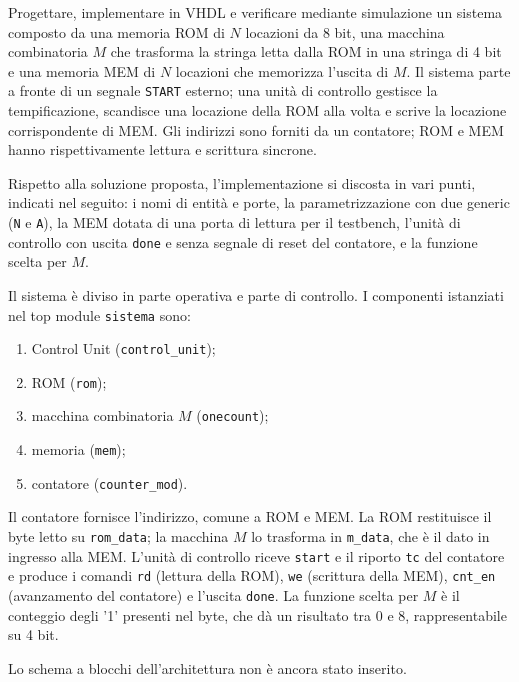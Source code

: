 \label{sec:esercizio6-1}

\begin{traccia}
Progettare, implementare in VHDL e verificare mediante simulazione un sistema composto da una memoria ROM di $N$ locazioni da 8 bit, una macchina combinatoria $M$ che trasforma la stringa letta dalla ROM in una stringa di 4 bit e una memoria MEM di $N$ locazioni che memorizza l'uscita di $M$. Il sistema parte a fronte di un segnale \texttt{START} esterno; una unità di controllo gestisce la tempificazione, scandisce una locazione della ROM alla volta e scrive la locazione corrispondente di MEM. Gli indirizzi sono forniti da un contatore; ROM e MEM hanno rispettivamente lettura e scrittura sincrone.
\end{traccia}

Rispetto alla soluzione proposta, l'implementazione si discosta in vari punti, indicati nel seguito: i nomi di entità e porte, la parametrizzazione con due generic (\texttt{N} e \texttt{A}), la MEM dotata di una porta di lettura per il testbench, l'unità di controllo con uscita \texttt{done} e senza segnale di reset del contatore, e la funzione scelta per $M$.

\progetto

Il sistema è diviso in parte operativa e parte di controllo. I componenti istanziati nel top module \texttt{sistema} sono:
\begin{enumerate}
  \item Control Unit (\texttt{control\_unit});
  \item ROM (\texttt{rom});
  \item macchina combinatoria $M$ (\texttt{onecount});
  \item memoria (\texttt{mem});
  \item contatore (\texttt{counter\_mod}).
\end{enumerate}

Il contatore fornisce l'indirizzo, comune a ROM e MEM. La ROM restituisce il byte letto su \texttt{rom\_data}; la macchina $M$ lo trasforma in \texttt{m\_data}, che è il dato in ingresso alla MEM. L'unità di controllo riceve \texttt{start} e il riporto \texttt{tc} del contatore e produce i comandi \texttt{rd} (lettura della ROM), \texttt{we} (scrittura della MEM), \texttt{cnt\_en} (avanzamento del contatore) e l'uscita \texttt{done}. La funzione scelta per $M$ è il conteggio degli '1' presenti nel byte, che dà un risultato tra 0 e 8, rappresentabile su 4 bit.

Lo schema a blocchi dell'architettura non è ancora stato inserito.

